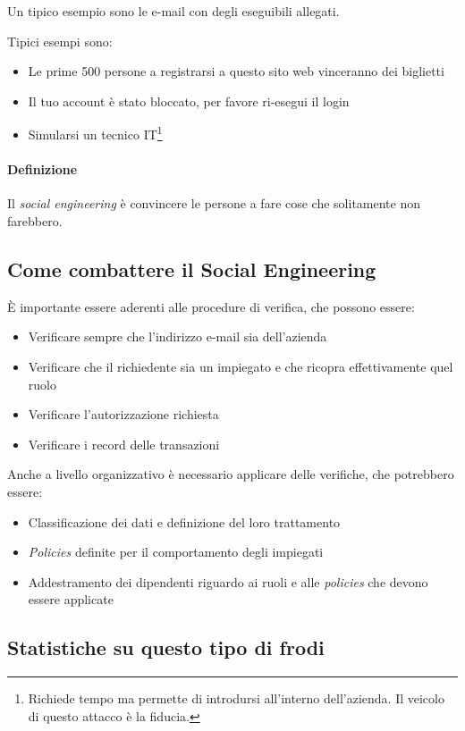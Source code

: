 Un tipico esempio sono le e-mail con degli eseguibili allegati.

Tipici esempi sono:
\begin{itemize}
  \item Le prime 500 persone a registrarsi a questo sito web vinceranno dei
  biglietti
  \item Il tuo account è stato bloccato, per favore ri-esegui il login
  \item Simularsi un tecnico IT\footnote{Richiede tempo ma permette di
introdursi all'interno dell'azienda. Il veicolo
di questo attacco è la fiducia.}
\end{itemize}

\paragraph*{Definizione} Il \textit{social engineering} è convincere le persone
a fare cose che solitamente non farebbero.

\subsection{Come combattere il Social Engineering}

È importante essere aderenti alle procedure di verifica, che possono essere:
\begin{itemize}
  \item Verificare sempre che l'indirizzo e-mail sia dell'azienda
  \item Verificare che il richiedente sia un impiegato e che ricopra
  effettivamente quel ruolo
  \item Verificare l'autorizzazione richiesta
  \item Verificare i record delle transazioni
\end{itemize}

Anche a livello organizzativo è necessario applicare delle verifiche, che
potrebbero essere:
\begin{itemize}
  \item Classificazione dei dati e definizione del loro trattamento
  \item \textit{Policies} definite per il comportamento degli impiegati
  \item Addestramento dei dipendenti riguardo ai ruoli e alle \textit{policies}
che devono essere applicate
\end{itemize}

\subsection{Statistiche su questo tipo di frodi}

